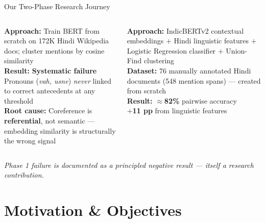 \documentclass[aspectratio=169]{beamer}
\begin{document}
\begin{frame}{Our Two-Phase Research Journey}
  \begin{columns}[T]
      \begin{tcolorbox}[wbox={Phase 1 — Scratch BERT (Failed)}]
        \small
        \textbf{Approach:} Train BERT from scratch on 172K Hindi
        Wikipedia docs; cluster mentions by cosine similarity\\[6pt]
        \textbf{Result:} \textcolor{red!70!black}{\textbf{Systematic failure}}\\[3pt]
        Pronouns (\textit{vah, usne}) \emph{never} linked to
        correct antecedents at any threshold\\[6pt]
        \textbf{Root cause:} Coreference is \textbf{referential},
        not semantic — embedding similarity is structurally the
        wrong signal
      \end{tcolorbox}

      \begin{tcolorbox}[rbox={Phase 2 — Hybrid System (Succeeded)}]
        \small
        \textbf{Approach:} IndicBERTv2 contextual embeddings
        $+$ Hindi linguistic features
        $+$ Logistic Regression classifier
        $+$ Union-Find clustering\\[6pt]
        \textbf{Dataset:} 76 manually annotated Hindi documents
        (548 mention spans) — created from scratch\\[6pt]
        \textbf{Result:} ${\approx}$\textbf{82\%} pairwise accuracy\\
        \textcolor{accentgreen}{\textbf{$+$11 pp} from linguistic features}
      \end{tcolorbox}
  \end{columns}
  \vspace{6pt}
  \centering\small\textit{Phase 1 failure is documented as a principled
  negative result — itself a research contribution.}
\end{frame}


\section{Motivation \& Objectives}
\end{document}
